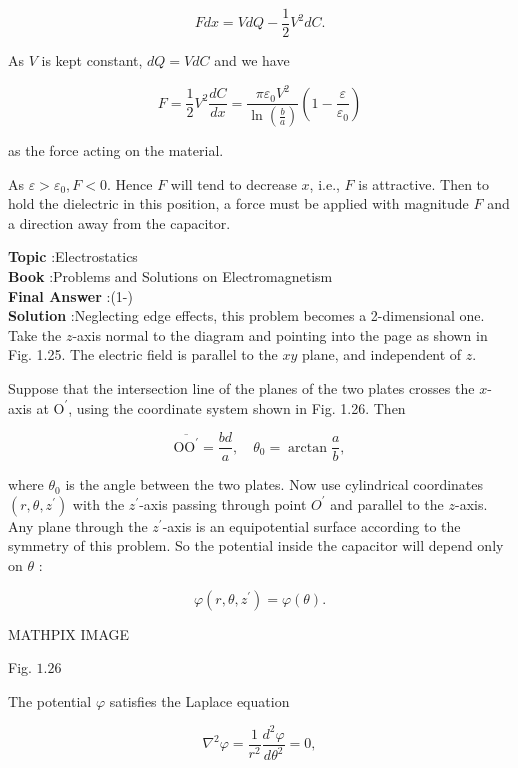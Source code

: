 \documentclass[10pt]{article}
\begin{document}
$$
F d x=V d Q-\frac{1}{2} V^{2} d C .
$$

As $V$ is kept constant, $d Q=V d C$ and we have

$$
F=\frac{1}{2} V^{2} \frac{d C}{d x}=\frac{\pi \varepsilon_{0} V^{2}}{\ln \left(\frac{b}{a}\right)}\left(1-\frac{\varepsilon}{\varepsilon_{0}}\right)
$$

as the force acting on the material.

As $\varepsilon>\varepsilon_{0}, F<0$. Hence $F$ will tend to decrease $x$, i.e., $F$ is attractive. Then to hold the dielectric in this position, a force must be applied with magnitude $F$ and a direction away from the capacitor.


\textbf{Topic} :Electrostatics\\
\textbf{Book} :Problems and Solutions on Electromagnetism\\
\textbf{Final Answer} :\left(1-\right)\\


\textbf{Solution} :Neglecting edge effects, this problem becomes a 2-dimensional one. Take the $z$-axis normal to the diagram and pointing into the page as shown in Fig. 1.25. The electric field is parallel to the $x y$ plane, and independent of $z$.

Suppose that the intersection line of the planes of the two plates crosses the $x$-axis at $\mathrm{O}^{\prime}$, using the coordinate system shown in Fig. 1.26. Then

$$
\overline{\mathrm{OO}^{\prime}}=\frac{b d}{a}, \quad \theta_{0}=\arctan \frac{a}{b},
$$

where $\theta_{0}$ is the angle between the two plates. Now use cylindrical coordinates $\left(r, \theta, z^{\prime}\right)$ with the $z^{\prime}$-axis passing through point $O^{\prime}$ and parallel to the $z$-axis. Any plane through the $z^{\prime}$-axis is an equipotential surface according to the symmetry of this problem. So the potential inside the capacitor will depend only on $\theta$ :

$$
\varphi\left(r, \theta, z^{\prime}\right)=\varphi(\theta) .
$$

MATHPIX IMAGE

Fig. $1.26$

The potential $\varphi$ satisfies the Laplace equation

$$
\nabla^{2} \varphi=\frac{1}{r^{2}} \frac{d^{2} \varphi}{d \theta^{2}}=0,
$$
\end{document}
